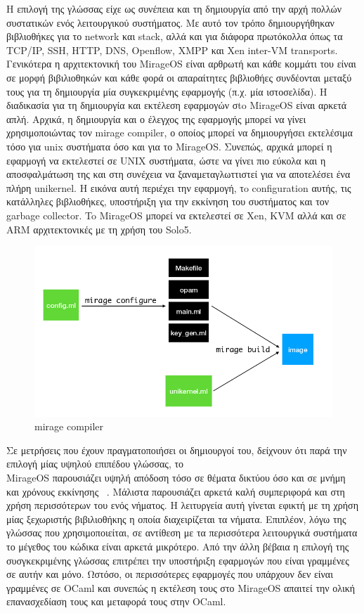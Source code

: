 Η επιλογή της γλώσσας είχε ως συνέπεια και τη δημιουργία από την αρχή πολλών
συστατικών ενός λειτουργικού συστήματος. Με αυτό τον τρόπο δημιουργήθηκαν
βιβλιοθήκες για το network και  stack, αλλά και για διάφορα πρωτόκολλα
όπως τα TCP/IP, SSH, HTTP, DNS, Openflow, XMPP και Xen inter-VM transports.
Γενικότερα η αρχιτεκτονική του MirageOS είναι αρθρωτή και κάθε κομμάτι του είναι
σε μορφή βιβιλιοθηκών και κάθε φορά οι απαραίτητες βιβλιοθήες συνδέονται μεταξύ
τους για τη δημιουργία μία συγκεκριμένης εφαρμογής (π.χ. μία ιστοσελίδα). H
διαδικασία για τη δημιουργία και εκτέλεση εφαρμογών σto MirageOS είναι αρκετά
απλή. Αρχικά, η δημιουργία και ο έλεγχος της εφαρμογής μπορεί να γίνει
χρησιμοποιώντας τον mirage compiler, ο οποίος μπορεί να δημιουργήσει εκτελέσιμα
τόσο για unix συστήματα όσο και για το MirageOS. Συνεπώς, αρχικά μπορεί η
εφαρμογή να εκτελεστεί σε UNIX συστήματα, ώστε να γίνει πιο εύκολα και η
αποσφαλμάτωση της και στη συνέχεια να ξαναμεταγλωττιστεί για να αποτελέσει ένα
πλήρη unikernel. Η εικόνα αυτή περιέχει την εφαρμογή, τo configuration
αυτής, τις κατάλληλες βιβλιοθήκες, υποστήριξη για την εκκίνηση του συστήματος
και τον garbage collector. To MirageOS μπορεί να εκτελεστεί σε Xen, KVM αλλά και
σε ARM αρχιτεκτονικές με τη χρήση του Solo5. 

\begin{figure}[htp]
\centering
\includegraphics[scale=0.5]{figures/mirage_compiler.png}
\caption{mirage compiler\label{fig3_7}}
\end{figure}

Σε μετρήσεις που έχουν πραγματοποιήσει οι δημιουργοί του, δείχνουν ότι παρά την
επιλογή μίας υψηλού επιπέδου γλώσσας, το \\MirageOS παρουσιάζει υψηλή απόδοση τόσο
σε θέματα δικτύου όσο και σε μνήμη και χρόνους εκκίνησης
~\cite{madhavapeddy2013unikernels}. Μάλιστα παρουσιάζει αρκετά καλή συμπεριφορά
και στη χρήση περισσότερων του ενός νήματος. Η λειτυργεία αυτή γίνεται εφικτή με
τη χρήση μίας ξεχωριστής βιβιλιοθήκης η οποία διαχειρίζεται τα νήματα. Επιπλέον,
λόγω της γλώσσας που χρησιμοποιείται, σε αντίθεση με τα περισσότερα λειτουργικά συστήματα το μέγεθος του κώδικα είναι
αρκετά μικρότερο. Από την άλλη βέβαια η επιλογή της συσγκεκριμένης γλώσσας
επιτρέπει την υποστήριξη εφαρμογών που είναι γραμμένες σε αυτήν και μόνο.
Ωστόσο, οι περισσότερες εφαρμογές που υπάρχουν δεν είναι γραμμένες σε OCaml και
συνεπώς η εκτέλεση τους στο MirageOS απαιτεί την ολική επανασχεδίαση τους και
μεταφορά τους στην OCaml.

